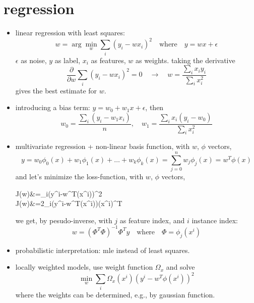 \documentclass{article}
\begin{document}
\section{regression}
\begin{itemize}
	\item linear regression with least squares: 
		\begin{equation}
			w=\arg\min_w\sum_i(y_i-wx_i)^2\quad\text{where}\quad y=wx+\epsilon
		\end{equation}
		$\epsilon$ as noise, $y$ as label, $x_i$ as features, $w$ as weights. taking the derivative
		\begin{equation}
			\frac{\partial}{\partial w}\sum_i(y_i-wx_i)^2=0\quad\rightarrow\quad
			w=\frac{\sum_ix_iy_i}{\sum_i x_i^2}
		\end{equation}
		gives the best estimate for $w$. 
	\item introducing a bias term: $y=w_0+w_1x+\epsilon$, then
		\begin{equation}
			w_0=\frac{\sum_i(y_i-w_1x_i)}{n},\quad w_1=\frac{\sum_ix_i(y_i-w_0)}{\sum_ix_i^2}
		\end{equation}
	\item multivariate regression + non-linear basis function, with $w$, $\phi$ vectors, 
		\begin{equation}
			y=w_0\phi_0(x)+w_1\phi_1(x)+\dots+w_k\phi_k(x)=\sum_{j=0}^nw_j\phi_j(x)=w^T\phi(x)
		\end{equation}
		and let's minimize the loss-function, with $w$, $\phi$ vectors, 
		\begin{flalign}
			J(w)&=\sum_i\left(y^i-w^T\phi(x^i)\right)^2\\
			J(w)&=2\sum_i(y^i-w^T\phi(x^i))\phi(x^i)^T
		\end{flalign}
		we get, by pesudo-inverse, with $j$ as feature index, and $i$ instance index:
		\begin{equation}
			w=(\Phi^T\Phi)^{-1}\Phi^Ty\quad\text{where}\quad \Phi=\phi_j(x^i)
		\end{equation}
	\item probabilistic interpretation: mle instead of least squares. 
	\item locally weighted models, use weight function $\Omega_x$ and solve
		\begin{equation}
			\min_w\sum_i\Omega_x(x^i)(y^i-w^T\phi(x^i))^2
		\end{equation}
		where the weights can be determined, e.g., by gaussian function. 
\end{itemize}
\end{document}
